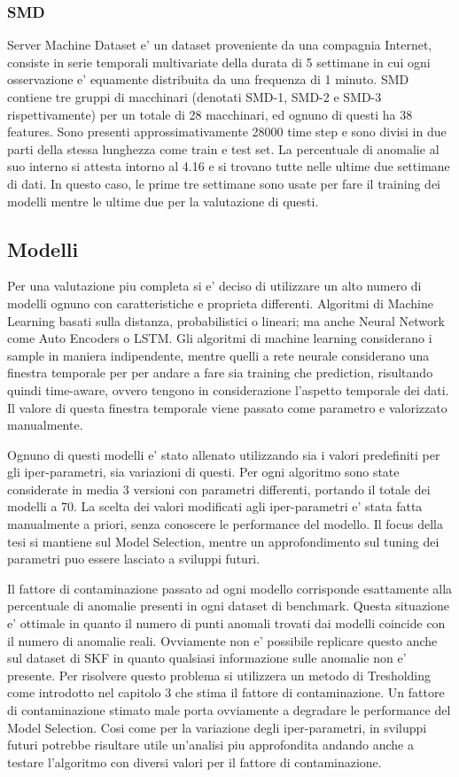 \subsubsection{SMD}
Server Machine Dataset e' un dataset proveniente da una compagnia Internet, consiste in serie temporali multivariate della durata di 5 settimane in cui ogni osservazione e' equamente distribuita da una frequenza di 1 minuto. SMD contiene tre gruppi di macchinari (denotati SMD-1, SMD-2 e SMD-3 rispettivamente) per un totale di 28 macchinari, ed ognuno di questi ha 38 features. Sono presenti approssimativamente 28000 time step e sono divisi in due parti della stessa lunghezza come train e test set. 
La percentuale di anomalie al suo interno si attesta intorno al 4.16 e si trovano tutte nelle ultime due settimane di dati. In questo caso, le prime tre settimane sono usate per fare il training dei modelli mentre le ultime due per la valutazione di questi.



\subsection{Modelli}
Per una valutazione piu completa si e' deciso di utilizzare un alto numero di modelli ognuno con caratteristiche e proprieta differenti. Algoritmi di Machine Learning basati sulla distanza, probabilistici o lineari; ma anche Neural Network come Auto Encoders o LSTM.
Gli algoritmi di machine learning considerano i sample in maniera indipendente, mentre quelli a rete neurale considerano una finestra temporale per per andare a fare sia training che prediction, risultando quindi time-aware, ovvero tengono in considerazione l'aspetto temporale dei dati. Il valore di questa finestra temporale viene passato come parametro e valorizzato manualmente.

Ognuno di questi modelli e' stato allenato utilizzando sia i valori predefiniti per gli iper-parametri, sia variazioni di questi. 
Per ogni algoritmo sono state considerate in media 3 versioni con parametri differenti, portando il totale dei modelli a 70.
La scelta dei valori modificati agli iper-parametri e' stata fatta manualmente a priori, senza conoscere le performance del modello. Il focus della tesi si mantiene sul Model Selection, mentre un approfondimento sul tuning dei parametri puo essere lasciato a sviluppi futuri.

Il fattore di contaminazione passato ad ogni modello corrisponde esattamente alla percentuale di anomalie presenti in ogni dataset di benchmark. Questa situazione e' ottimale in quanto il numero di punti anomali trovati dai modelli coincide con il numero di anomalie reali. Ovviamente non e' possibile replicare questo anche sul dataset di SKF in quanto qualsiasi informazione sulle anomalie non e' presente. Per risolvere questo problema si utilizzera un metodo di Tresholding come introdotto nel capitolo 3 che stima il fattore di contaminazione. Un fattore di contaminazione stimato male porta ovviamente a degradare le performance del Model Selection. Cosi come per la variazione degli iper-parametri, in sviluppi futuri potrebbe risultare utile un'analisi piu approfondita andando anche a testare l'algoritmo con diversi valori per il fattore di contaminazione.



